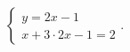 $\displaystyle
\left\{
\begin{array}{l}
\displaystyle y = 2x - 1 \\
\displaystyle x + 3\cdot 2x - 1 = 2
\end{array}
\right.
$.
